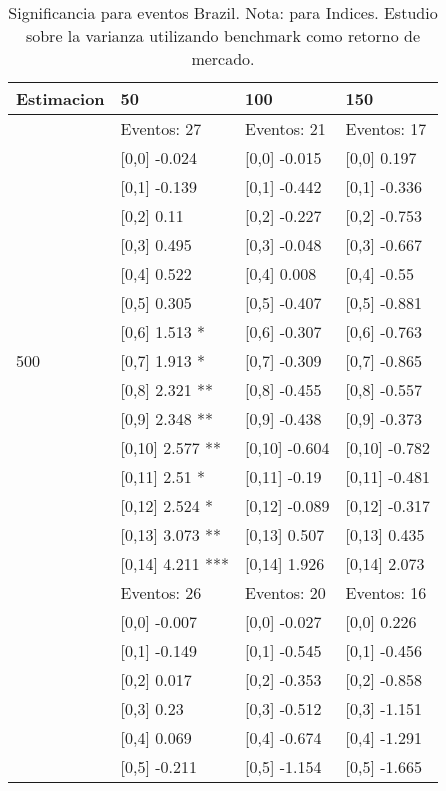 \begin{table}

\caption{Significancia para eventos Brazil. Nota: para Indices. Estudio sobre la varianza utilizando benchmark como retorno de mercado.}
\centering
\begin{tabular}[t]{llll}
\toprule
Estimacion & 50 & 100 & 150\\
\midrule
 & Eventos:  27 & Eventos:  21 & Eventos:  17\\
 & {}[0,0] -0.024 & {}[0,0] -0.015 & {}[0,0] 0.197\\
 & {}[0,1] -0.139 & {}[0,1] -0.442 & {}[0,1] -0.336\\
 & {}[0,2] 0.11 & {}[0,2] -0.227 & {}[0,2] -0.753\\
 & {}[0,3] 0.495 & {}[0,3] -0.048 & {}[0,3] -0.667\\
\addlinespace
 & {}[0,4] 0.522 & {}[0,4] 0.008 & {}[0,4] -0.55\\
 & {}[0,5] 0.305 & {}[0,5] -0.407 & {}[0,5] -0.881\\
 & {}[0,6] 1.513 * & {}[0,6] -0.307 & {}[0,6] -0.763\\
500 & {}[0,7] 1.913 * & {}[0,7] -0.309 & {}[0,7] -0.865\\
 & {}[0,8] 2.321 ** & {}[0,8] -0.455 & {}[0,8] -0.557\\
\addlinespace
 & {}[0,9] 2.348 ** & {}[0,9] -0.438 & {}[0,9] -0.373\\
 & {}[0,10] 2.577 ** & {}[0,10] -0.604 & {}[0,10] -0.782\\
 & {}[0,11] 2.51 * & {}[0,11] -0.19 & {}[0,11] -0.481\\
 & {}[0,12] 2.524 * & {}[0,12] -0.089 & {}[0,12] -0.317\\
 & {}[0,13] 3.073 ** & {}[0,13] 0.507 & {}[0,13] 0.435\\
\addlinespace
 & {}[0,14] 4.211 *** & {}[0,14] 1.926 & {}[0,14] 2.073\\
 & Eventos:  26 & Eventos:  20 & Eventos:  16\\
 & {}[0,0] -0.007 & {}[0,0] -0.027 & {}[0,0] 0.226\\
 & {}[0,1] -0.149 & {}[0,1] -0.545 & {}[0,1] -0.456\\
 & {}[0,2] 0.017 & {}[0,2] -0.353 & {}[0,2] -0.858\\
\addlinespace
 & {}[0,3] 0.23 & {}[0,3] -0.512 & {}[0,3] -1.151\\
 & {}[0,4] 0.069 & {}[0,4] -0.674 & {}[0,4] -1.291\\
 & {}[0,5] -0.211 & {}[0,5] -1.154 & {}[0,5] -1.665\\

\end{tabular}
\end{table}
